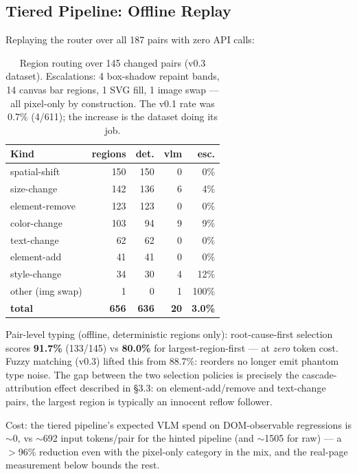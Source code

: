 \documentclass[10pt,twocolumn,letterpaper]{article}
\begin{document}
\subsection{Tiered Pipeline: Offline Replay\label{sec:replay}}

Replaying the router over all 187 pairs with zero API calls:

\begin{table}[h]
\centering
\small
\begin{tabular}{lrrrr}
\toprule
\textbf{Kind} & \textbf{regions} & \textbf{det.} & \textbf{vlm} & \textbf{esc.} \\
\midrule
spatial-shift & 150 & 150 & 0 & 0\% \\
size-change & 142 & 136 & 6 & 4\% \\
element-remove & 123 & 123 & 0 & 0\% \\
color-change & 103 & 94 & 9 & 9\% \\
text-change & 62 & 62 & 0 & 0\% \\
element-add & 41 & 41 & 0 & 0\% \\
style-change & 34 & 30 & 4 & 12\% \\
other (img swap) & 1 & 0 & 1 & 100\% \\
\midrule
\textbf{total} & \textbf{656} & \textbf{636} & \textbf{20} & \textbf{3.0\%} \\
\bottomrule
\end{tabular}
\caption{Region routing over 145 changed pairs (v0.3 dataset). Escalations: 4 box-shadow repaint bands, 14 canvas bar regions, 1 SVG fill, 1 image swap — all pixel-only by construction. The v0.1 rate was 0.7\% (4/611); the increase is the dataset doing its job.}
\label{tab:replay}
\end{table}

Pair-level typing (offline, deterministic regions only): root-cause-first selection scores \textbf{91.7\%} (133/145) vs \textbf{80.0\%} for largest-region-first — at \textit{zero} token cost. Fuzzy matching (v0.3) lifted this from 88.7\%: reorders no longer emit phantom type noise. The gap between the two selection policies is precisely the cascade-attribution effect described in \S3.3: on element-add/remove and text-change pairs, the largest region is typically an innocent reflow follower.

Cost: the tiered pipeline's expected VLM spend on DOM-observable regressions is $\sim$0, vs $\sim$692 input tokens/pair for the hinted pipeline (and $\sim$1505 for raw) — a $>$96\% reduction even with the pixel-only category in the mix, and the real-page measurement below bounds the rest.
\end{document}
